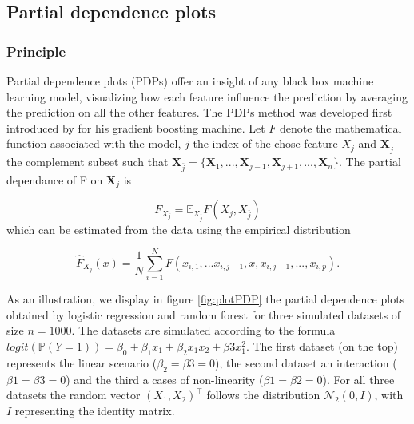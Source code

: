 \documentclass[12pt]{article}
\begin{document}
\subsection{Partial dependence plots}
\subsubsection{Principle}
Partial dependence plots (PDPs) offer an insight of any black box machine learning model, visualizing how each feature influence the prediction by averaging the prediction on all the other features. The PDPs method was developed first introduced by \cite{friedman2001greedy} for his gradient boosting machine. Let $F$ denote the mathematical function associated with the model, $j$ the index of the chose feature $X_j$ and $\bm{X}_{\overline{j}}$ the complement subset such that $\bm{X}_{\overline{j}} = \{\bm{X}_1,...,\bm{X}_{j-1},\bm{X}_{j+1},...,\bm{X}_n\}$. The partial dependance of F on $\bm{X}_j$ is 

\begin{equation}
F_{X_j} = \mathbb{E}_{X_{\overline{j}}}F(X_j,X_{\overline{j}})
\label{PDPesperance}
\end{equation}
which can be estimated from the data using the empirical distribution

\begin{equation}
\hat{F}_{X_j}(x) = \frac{1}{N} \sum_{i=1}^N F(x_{i,1},...x_{i,j-1},x,x_{i,j+1},...,x_{i,p}).
\label{PDPestimation}
\end{equation}


As an illustration, we display in figure \ref{fig:plotPDP} the partial dependence plots obtained by logistic regression and random forest for three simulated datasets of size $n=1000$. The datasets are simulated according to the formula $logit(\mathbb{P}(Y=1))=\beta_0+\beta_1x_1+\beta_2x_1x_2+\beta3x_1^2$. The first dataset (on the top) represents the linear scenario ($\beta_2=\beta3=0$), the second dataset an interaction ($\beta1=\beta3=0$) and the third a cases of non-linearity ($\beta1=\beta2=0$). For all three datasets the random vector $(X_1,X_2)^\top$ follows the distribution {$\mathcal{N}_2(0,I)$}, with $I$ representing the identity matrix. \\
\end{document}
